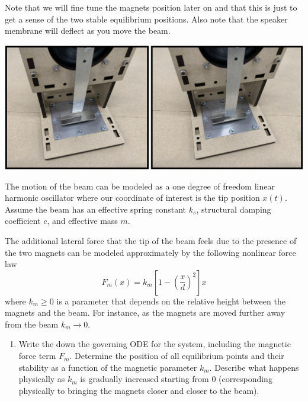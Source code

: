 \documentclass[12pt,letterpaper,english]{article}
\begin{document}
{\small *Note that we will fine tune the magnets position later on and that this is just to get a sense of the two stable equilibrium positions.  Also note that the speaker membrane will deflect as you move the beam.}

\begin{center}
\includegraphics[width=5.5in]{lab3d.png}
\end{center}



The motion of the beam can be modeled as a one degree of freedom linear harmonic oscillator where our coordinate of interest is the tip position $x(t)$.  Assume the beam has an effective spring constant $k_s$, structural damping coefficient $c$, and effective mass $m$.

The additional lateral force that the tip of the beam feels due to the presence of the two magnets can be modeled approximately by the following nonlinear force law
\begin{equation}
F_m(x)=k_m \left[1-\left(\frac{x}{d}\right)^2\right]x \nonumber
\end{equation}
where $k_m\geq0$ is a parameter that depends on the relative height between the magnets and the beam.  For instance, as the magnets are moved further away from the beam $k_m \rightarrow 0$.


\begin{enumerate}
\item Write the down the governing ODE for the system, including the magnetic force term $F_m$.  Determine the position of all equilibrium points and their stability as a function of the magnetic parameter $k_m$.  Describe what happens physically as $k_m$ is gradually increased starting from 0 (corresponding physically to bringing the magnets closer and closer to the beam).
\end{enumerate}
\end{document}
